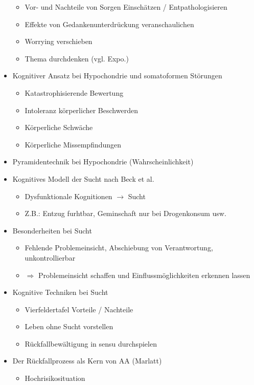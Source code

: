 \documentclass[11pt, paper=a4, twocolumn]{scrartcl}
\begin{document}
\begin{itemize}
\begin{itemize}
					\item Vor- und Nachteile von Sorgen Einschätzen / Entpathologisieren
					\item Effekte von Gedankenunterdrückung veranschaulichen
					\item Worrying verschieben
					\item Thema durchdenken (vgl. Expo.)
				\end{itemize}
			\item Kognitiver Ansatz bei Hypochondrie und somatoformen Störungen
				\begin{itemize}
					\item Katastrophisierende Bewertung
					\item Intoleranz körperlicher Beschwerden
					\item Körperliche Schwäche
					\item Körperliche Missempfindungen
				\end{itemize}
			\item Pyramidentechnik bei Hypochondrie (Wahrscheinlichkeit)
			\item Kognitives Modell der Sucht nach Beck et al.
				\begin{itemize}
					\item Dysfunktionale Kognitionen $\rightarrow$ Sucht
					\item Z.B.: Entzug furhtbar, Geminschaft nur bei Drogenkonsum usw.
				\end{itemize}
			\item Besonderheiten bei Sucht
				\begin{itemize}
					\item Fehlende Problemeinsicht, Abschiebung von Verantwortung, unkontrollierbar
					\item $\Rightarrow$ Problemeinsicht schaffen und Einflussmöglichkeiten erkennen lassen
				\end{itemize}
			\item Kognitive Techniken bei Sucht
				\begin{itemize}
					\item Vierfeldertafel Vorteile / Nachteile
					\item Leben ohne Sucht vorstellen
					\item Rückfallbewältigung in sensu durchspielen
				\end{itemize}
			\item Der Rückfallprozess als Kern von AA (Marlatt)
				\begin{itemize}
					\item Hochrisikosituation

\end{itemize}
\end{itemize}
\end{document}
